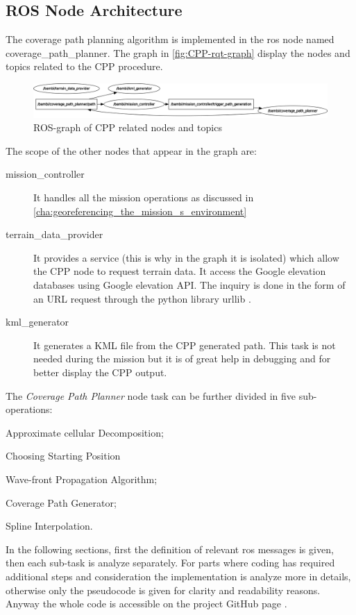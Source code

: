 \subsection{ROS Node Architecture} %
\label{sub:ros_node_architecture}
The coverage path planning algorithm is implemented in the \acrshort{ros} node named \textsf{coverage\_path\_planner}. The graph in \autoref{fig:CPP-rqt-graph} display the nodes and topics related to the CPP procedure.
\begin{figure}[ht]
    \centering
    \includegraphics[width=1\textwidth]{figures/C3/CPP-rqt-graph.png}
    \caption{ROS-graph of CPP related nodes and topics}
    \label{fig:CPP-rqt-graph}
\end{figure}
The scope of the other nodes that appear in the graph are:
\begin{description}
	\item[\textsf{mission\_controller}] It handles all the mission operations as discussed in \autoref{cha:georeferencing_the_mission_s_environment}
	\item[\textsf{terrain\_data\_provider}] It provides a service (this is why in the graph it is isolated) which allow the CPP node to request terrain data. It access the Google elevation databases using Google elevation API. The inquiry is done in the form of an URL request through the python library \textsf{urllib} \cite{urllib}. 
	\item[\textsf{kml\_generator}] It generates a KML file from the CPP generated path. This task is not needed during the mission but it is of great help in debugging and for better display the CPP output.
\end{description}
The \textit{Coverage Path Planner} node task can be further divided in five sub-operations:
\begin{enumerate*}[label={(\arabic*)}]
	\item Approximate cellular Decomposition;
	\item Choosing Starting Position
	\item Wave-front Propagation Algorithm;
	\item Coverage Path Generator;
	\item Spline Interpolation.
\end{enumerate*}\par
In the following sections, first the definition of relevant \acrshort{ros} messages is given, then each sub-task is analyze separately. For parts where coding has required additional steps and consideration the implementation is analyze more in details, otherwise only the pseudocode is given for clarity and readability reasons. Anyway the whole code is accessible on the project GitHub page \cite{bambiProjectGit}.
